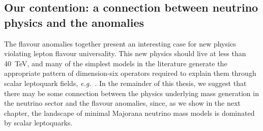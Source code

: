 \subsection{Our contention: a connection between neutrino physics and the anomalies}

The flavour anomalies together present an interesting case for new physics
violating lepton flavour universality. This new physics should live at less than
\SI{40}{\TeV}, and many of the simplest models in the literature generate the
appropriate pattern of dimension-six operators required to explain them through
scalar leptoquark fields, \textit{e.g.}~\cite{Bauer:2015knc, Becirevic:2016oho,
  Angelescu:2018tyl}. In the remainder of this thesis, we suggest that there may
be some connection between the physics underlying mass generation in the
neutrino sector and the flavour anomalies, since, as we show in the next
chapter, the landscape of minimal Majorana neutrino mass models is dominated by
scalar leptoquarks.
